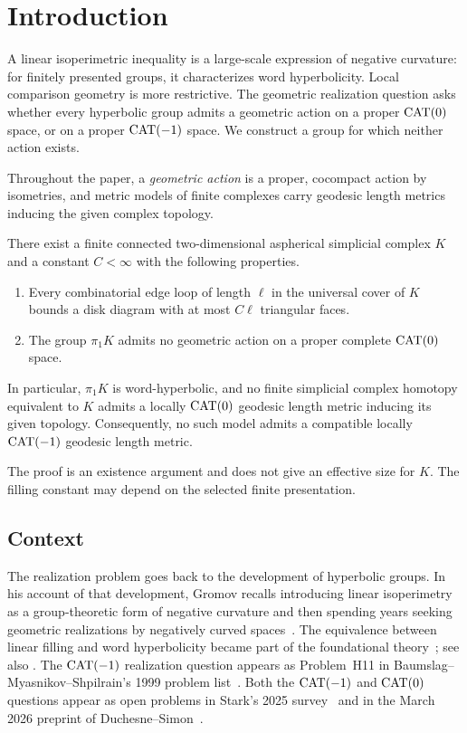 \section{Introduction}\label{sec:introduction}
A linear isoperimetric inequality is a large-scale expression of negative curvature: for finitely presented groups, it characterizes word hyperbolicity. Local comparison geometry is more restrictive. The geometric realization question asks whether every hyperbolic group admits a geometric action on a proper $\operatorname{CAT}(0)$ space, or on a proper $\operatorname{CAT}(-1)$ space. We construct a group for which neither action exists.

Throughout the paper, a \emph{geometric action} is a proper, cocompact action by isometries, and metric models of finite complexes carry geodesic length metrics inducing the given complex topology.

\begin{theorem}\label{thm:main}
There exist a finite connected two-dimensional aspherical simplicial complex $K$ and a constant $C<\infty$ with the following properties.
\begin{enumerate}[label=\textup{(\roman*)}]
\item Every combinatorial edge loop of length $\ell$ in the universal cover of $K$ bounds a disk diagram with at most $C\ell$ triangular faces.
\item The group $\pi_1K$ admits no geometric action on a proper complete $\operatorname{CAT}(0)$ space.
\end{enumerate}
In particular, $\pi_1K$ is word-hyperbolic, and no finite simplicial complex homotopy equivalent to $K$ admits a locally $\operatorname{CAT}(0)$ geodesic length metric inducing its given topology. Consequently, no such model admits a compatible locally $\operatorname{CAT}(-1)$ geodesic length metric.
\end{theorem}

The proof is an existence argument and does not give an effective size for $K$. The filling constant may depend on the selected finite presentation.

\subsection{Context}
The realization problem goes back to the development of hyperbolic groups.
In his account of that development, Gromov recalls introducing linear
isoperimetry as a group-theoretic form of negative curvature and then
spending years seeking geometric realizations by negatively curved
spaces~\cite[p.~396]{RaussenSkau2010}.
The equivalence between linear filling and word hyperbolicity became
part of the foundational theory~\cite{Gromov1987}; see also
\cite[Theorem~III.$\Gamma$.2.6 and Remark~III.$\Gamma$.2.7(2)]{BH1999}.
The $\operatorname{CAT}(-1)$ realization question appears as Problem~H11 in
Baumslag--Myasnikov--Shpilrain's 1999 problem
list~\cite{BaumslagMyasnikovShpilrain1999}.
Both the $\operatorname{CAT}(-1)$ and $\operatorname{CAT}(0)$ questions appear as open problems
in Stark's 2025 survey~\cite[Open Problem~2.15]{Stark2025} and in the
March 2026 preprint of Duchesne--Simon~\cite[Question~W]{DuchesneSimon2026}.


